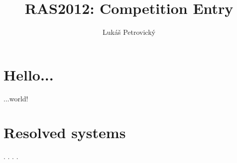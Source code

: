 \documentclass[10pt,a4paper,draft]{article}
\author{Lukáš Petrovický}
\title{RAS2012: Competition Entry}
\begin{document}
\maketitle
\listoffigures
\listoftables
\tableofcontents
 
\section{Hello...}

...world!

\appendix

\section{Resolved systems}

.
.
.
.
\end{document}
